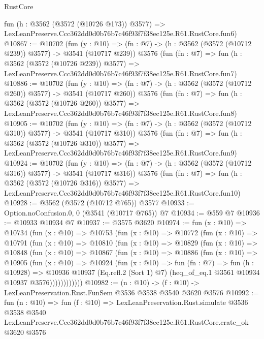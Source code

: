 \begin{lexlean}{RustCore}
\begin{coremodule}
    fun (h : @3562 (@3572 (@10726 @173)) @3577) =>
    LexLeanPreserve.Ccc362dd0d0b76b7c46f93f7f38ec125e.R61.RustCore.fun6)
@10867 := @10702
    (fun (y : @10) => (fn : @7) -> (h : @3562 (@3572 (@10712 @239)) @3577) -> @3541 (@10717 @239))
    @3576
    (fun (fn : @7) =>
    fun (h : @3562 (@3572 (@10726 @239)) @3577) =>
    LexLeanPreserve.Ccc362dd0d0b76b7c46f93f7f38ec125e.R61.RustCore.fun7)
@10886 := @10702
    (fun (y : @10) => (fn : @7) -> (h : @3562 (@3572 (@10712 @260)) @3577) -> @3541 (@10717 @260))
    @3576
    (fun (fn : @7) =>
    fun (h : @3562 (@3572 (@10726 @260)) @3577) =>
    LexLeanPreserve.Ccc362dd0d0b76b7c46f93f7f38ec125e.R61.RustCore.fun8)
@10905 := @10702
    (fun (y : @10) => (fn : @7) -> (h : @3562 (@3572 (@10712 @310)) @3577) -> @3541 (@10717 @310))
    @3576
    (fun (fn : @7) =>
    fun (h : @3562 (@3572 (@10726 @310)) @3577) =>
    LexLeanPreserve.Ccc362dd0d0b76b7c46f93f7f38ec125e.R61.RustCore.fun9)
@10924 := @10702
    (fun (y : @10) => (fn : @7) -> (h : @3562 (@3572 (@10712 @316)) @3577) -> @3541 (@10717 @316))
    @3576
    (fun (fn : @7) =>
    fun (h : @3562 (@3572 (@10726 @316)) @3577) =>
    LexLeanPreserve.Ccc362dd0d0b76b7c46f93f7f38ec125e.R61.RustCore.fun10)
@10928 := @3562 (@3572 (@10712 @765)) @3577
@10933 := Option.noConfusion.{0, 0} (@3541 (@10717 @765)) @7
@10934 := @559 @7
@10936 := @10933 @10934 @7
@10937 := @3575 @3620
@10974 := fun (x : @10) =>
  @10734
    (fun (x : @10) =>
    @10753
      (fun (x : @10) =>
      @10772
        (fun (x : @10) =>
        @10791
          (fun (x : @10) =>
          @10810
            (fun (x : @10) =>
            @10829
              (fun (x : @10) =>
              @10848
                (fun (x : @10) =>
                @10867
                  (fun (x : @10) =>
                  @10886
                    (fun (x : @10) =>
                    @10905
                      (fun (x : @10) =>
                      @10924
                        (fun (x : @10) =>
                        fun (fn : @7) =>
                        fun (h : @10928) =>
                        @10936
                          @10937
                          (Eq.refl.{2} (Sort 1) @7)
                          (heq_of_eq.{1} @3561 @10934 @10937 @3576))))))))))))
@10982 := (n : @10) -> (f : @10) -> LexLeanPreservation.Rust.FunSem @3536 @3538 @3540 @3620 @3576
@10992 := fun (n : @10) =>
  fun (f : @10) =>
  LexLeanPreservation.Rust.simulate
    @3536
    @3538
    @3540
    LexLeanPreserve.Ccc362dd0d0b76b7c46f93f7f38ec125e.R61.RustCore.crate_ok
    @3620
    @3576
\end{coremodule}
\end{lexlean}

